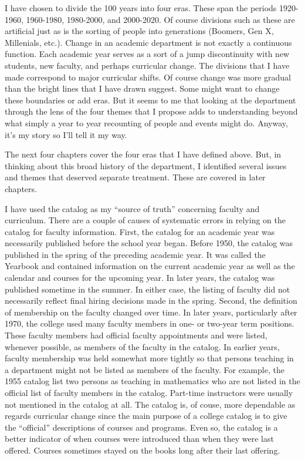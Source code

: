 \documentclass[
]{book}
\begin{document}
I have chosen to divide the 100 years into four eras. These span the periods 1920-1960, 1960-1980, 1980-2000, and 2000-2020. Of course divisions such as these are artificial just as is the sorting of people into generations (Boomers, Gen X, Millenials, etc.). Change in an academic department is not exactly a continuous function. Each academic year serves as a sort of a jump discontinuity with new students, new faculty, and perhaps curricular change. The divisions that I have made correspond to major curricular shifts. Of course change was more gradual than the bright lines that I have drawn suggest. Some might want to change these boundaries or add eras. But it seems to me that looking at the department through the lens of the four themes that I propose adds to understanding beyond what simply a year to year recounting of people and events might do. Anyway, it's my story so I'll tell it my way.

The next four chapters cover the four eras that I have defined above. But,
in thinking about this broad history of the department, I identified several issues and themes that deserved separate treatment. These are covered in later chapters.

I have used the catalog as my ``source of truth'' concerning faculty and curriculum. There are a couple of causes of systematic errors in relying on the catalog for faculty information. First, the catalog for an academic year was necessarily published before the school year began. Before 1950, the catalog was published in the spring of the preceding academic year. It was called the Yearbook and contained information on the current academic year as well as the calendar and courses for the upcoming year. In later years, the catalog was published sometime in the summer. In either case, the listing of faculty did not necessarily reflect final hiring decisions made in the spring. Second, the definition of membership on the faculty changed over time. In later years, particularly after 1970, the college used many faculty members in one- or two-year term positions. These faculty members had official faculty appointments and were listed, whenever possible, as members of the faculty in the catalog. In earlier years, faculty membership was held somewhat more tightly so that persons teaching in a department might not be listed as members of the faculty. For example, the 1955 catalog list two persons as teaching in mathematics who are not listed in the official list of faculty members in the catalog. Part-time instructors were usually not mentioned in the catalog at all. The catalog is, of couse, more dependable as regards curricular change since the main purpose of a college catalog is to give the ``official'' descriptions of courses and programs. Even so, the catalog is a better indicator of when courses were introduced than when they were last offered. Courses sometimes stayed on the books long after their last offering.
\end{document}
